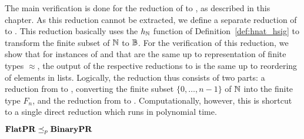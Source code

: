 The main verification is done for the reduction of \PR{} to \BPR{}, as described in this chapter. As this reduction cannot be extracted, we define a separate reduction of \FlatPR{} to \BPR{}. This reduction basically uses the $h_{\mathbb{N}}$ function of Definition~\ref{def:hnat_hsig} to transform the finite subset of $\mathbb{N}$ to $\mathbb{B}$. 
For the verification of this reduction, we show that for instances of \FlatPR{} and \PR{} that are the same up to representation of finite types $\approx$, the output of the respective reductions to \BPR{} is the same up to reordering of elements in lists. Logically, the reduction thus consists of two parts: a reduction from \FlatPR{} to \PR{}, converting the finite subset $\{0, \ldots, n-1\}$ of $\mathbb{N}$ into the finite type $F_n$, and the reduction from \PR{} to \BPR{}. Computationally, however, this is shortcut to a single direct reduction which runs in polynomial time.
\begin{theorem}
  $\textbf{FlatPR} \preceq_p{} \textbf {\textbf{BinaryPR}}{}$ 
\end{theorem}
